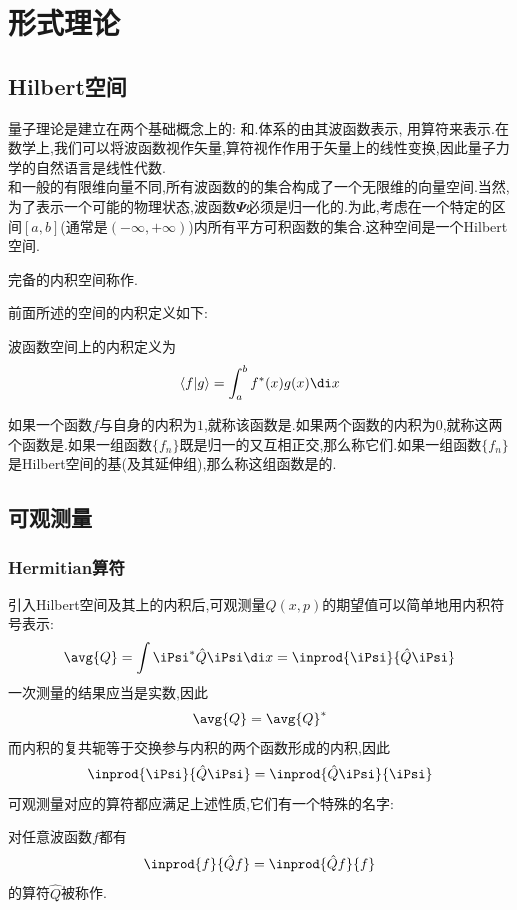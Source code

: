 \documentclass{ctexart}
\begin{document}
\section{形式理论}
\subsection{Hilbert空间}
量子理论是建立在两个基础概念上的: 和.体系的由其波函数表示, 用算符来表示.在数学上,我们可以将波函数视作矢量,算符视作作用于矢量上的线性变换,因此量子力学的自然语言是线性代数.\\
\indent 和一般的有限维向量不同,所有波函数的的集合构成了一个无限维的向量空间.当然,为了表示一个可能的物理状态,波函数$\mathbfit{\Psi}$必须是归一化的.为此,考虑在一个特定的区间$[a,b]$(通常是$(-\infty,+\infty)$)内所有平方可积函数的集合.这种空间是一个Hilbert空间.
\begin{definition}[Hilbert空间]
    完备的内积空间称作.
\end{definition}
前面所述的空间的内积定义如下:
\begin{definition}[波函数空间的内积]
    波函数空间上的内积定义为
    \[\left\langle f|g\right\rangle=\int_{a}^{b}f^\ast(x)g(x)\di x\]
\end{definition}
如果一个函数$f$与自身的内积为$1$,就称该函数是.如果两个函数的内积为$0$,就称这两个函数是.如果一组函数$\{f_n\}$既是归一的又互相正交,那么称它们.如果一组函数$\{f_n\}$是Hilbert空间的基(及其延伸组),那么称这组函数是的.
\subsection{可观测量}
\subsubsection{Hermitian算符}
引入Hilbert空间及其上的内积后,可观测量$Q(x,p)$的期望值可以简单地用内积符号表示:
\[\avg{Q}=\int\iPsi^\ast\hat{Q}\iPsi\di x=\inprod{\iPsi}{\hat{Q}\iPsi}\]
一次测量的结果应当是实数,因此
\[\avg{Q}=\avg{Q}^\ast\]
而内积的复共轭等于交换参与内积的两个函数形成的内积,因此
\[\inprod{\iPsi}{\hat{Q}\iPsi}=\inprod{\hat{Q}\iPsi}{\iPsi}\]
可观测量对应的算符都应满足上述性质,它们有一个特殊的名字:
\begin{definition}[Hermitian算符]
    对任意波函数$f$都有\[\inprod{f}{\hat{Q}f}=\inprod{\hat{Q}f}{f}\]的算符$\hat{Q}$被称作.
\end{definition}
\end{document}
